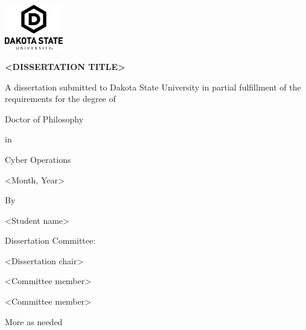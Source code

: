 \thispagestyle{empty}

\begin{center}
\includegraphics[width=1in]{img/DSU_UniversityLogo_Stacked_BLK}

\bigskip
{\Large\bfseries {\textless}\textbf{DISSERTATION TITLE}{\textgreater}}

\vspace*{.8in}

A dissertation submitted to Dakota State University in partial fulfillment of the requirements for the degree of

\vspace*{20pt}

Doctor of Philosophy

\vspace*{20pt}

in

\vspace*{20pt}

Cyber Operations

\vspace*{20pt}

{\textless}Month, Year{\textgreater}

\vspace*{20pt}

By

{\textless}Student name{\textgreater}

\vspace*{.5in}

Dissertation Committee:

\vspace*{13pt}

{\textless}Dissertation chair{\textgreater}

{\textless}Committee member{\textgreater}

{\textless}Committee member{\textgreater}

More as needed

\end{center}

\clearpage